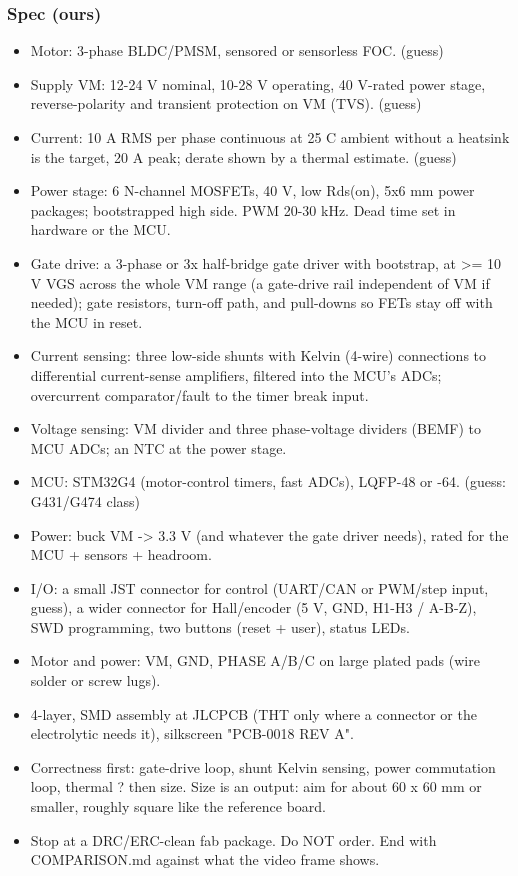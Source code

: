 \documentclass[11pt,a4paper]{article}
\begin{document}
\subsubsection*{Spec (ours)}
\begin{itemize}
\item Motor: 3-phase BLDC/PMSM, sensored or sensorless FOC. (guess)
\item Supply VM: 12-24 V nominal, 10-28 V operating, 40 V-rated power stage, reverse-polarity and transient
protection on VM (TVS). (guess)
\item Current: 10 A RMS per phase continuous at 25 C ambient without a heatsink is the target, 20 A peak; derate
shown by a thermal estimate. (guess)
\item Power stage: 6 N-channel MOSFETs, 40 V, low Rds(on), 5x6 mm power packages; bootstrapped high side.
PWM 20-30 kHz. Dead time set in hardware or the MCU.
\item Gate drive: a 3-phase or 3x half-bridge gate driver with bootstrap, at \textgreater{}= 10 V VGS across the whole VM range
(a gate-drive rail independent of VM if needed); gate resistors, turn-off path, and pull-downs so FETs stay
off with the MCU in reset.
\item Current sensing: three low-side shunts with Kelvin (4-wire) connections to differential current-sense
amplifiers, filtered into the MCU's ADCs; overcurrent comparator/fault to the timer break input.
\item Voltage sensing: VM divider and three phase-voltage dividers (BEMF) to MCU ADCs; an NTC at the power stage.
\item MCU: STM32G4 (motor-control timers, fast ADCs), LQFP-48 or -64. (guess: G431/G474 class)
\item Power: buck VM -\textgreater{} 3.3 V (and whatever the gate driver needs), rated for the MCU + sensors + headroom.
\item I/O: a small JST connector for control (UART/CAN or PWM/step input, guess), a wider connector for Hall/encoder
(5 V, GND, H1-H3 / A-B-Z), SWD programming, two buttons (reset + user), status LEDs.
\item Motor and power: VM, GND, PHASE A/B/C on large plated pads (wire solder or screw lugs).
\item 4-layer, SMD assembly at JLCPCB (THT only where a connector or the electrolytic needs it), silkscreen
"PCB-0018 REV A".
\item Correctness first: gate-drive loop, shunt Kelvin sensing, power commutation loop, thermal ? then size. Size is an
output: aim for about 60 x 60 mm or smaller, roughly square like the reference board.
\item Stop at a DRC/ERC-clean fab package. Do NOT order. End with COMPARISON.md against what the video frame shows.
\end{itemize}
\end{document}
